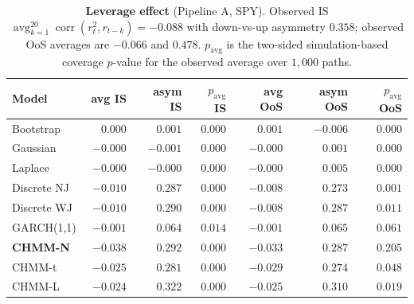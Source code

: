 \begin{table}[t]
\centering
\small
\caption{\textbf{Leverage effect} (Pipeline A, SPY). Observed IS $\operatorname{avg}_{k=1}^{20} \operatorname{corr}(r_t^2, r_{t-k}) = -0.088$ with down-vs-up asymmetry $0.358$; observed OoS averages are $-0.066$ and $0.478$. $p_{\text{avg}}$ is the two-sided simulation-based coverage $p$-value for the observed average over $1{,}000$ paths.}
\label{tab:leverage}
\begin{tabular}{lrrrrrr}
\toprule
Model & avg IS & asym IS & $p_{\text{avg}}$ IS & avg OoS & asym OoS & $p_{\text{avg}}$ OoS \\
\midrule
Bootstrap & $\phantom{-}0.000$ & $\phantom{-}0.001$ & $0.000$ & $\phantom{-}0.001$ & $-0.006$ & $0.000$ \\
Gaussian  & $-0.000$ & $-0.001$ & $0.000$ & $-0.000$ & $\phantom{-}0.001$ & $0.000$ \\
Laplace   & $-0.000$ & $-0.000$ & $0.000$ & $-0.000$ & $\phantom{-}0.005$ & $0.000$ \\
Discrete NJ & $-0.010$ & $\phantom{-}0.287$ & $0.000$ & $-0.008$ & $\phantom{-}0.273$ & $0.001$ \\
Discrete WJ & $-0.010$ & $\phantom{-}0.290$ & $0.000$ & $-0.008$ & $\phantom{-}0.287$ & $0.011$ \\
GARCH(1,1)  & $-0.001$ & $\phantom{-}0.064$ & $0.014$ & $-0.001$ & $\phantom{-}0.065$ & $0.061$ \\
\textbf{CHMM-N} & $\mathbf{-0.038}$ & $\phantom{-}0.292$ & $0.000$ & $\mathbf{-0.033}$ & $\phantom{-}0.287$ & $\mathbf{0.205}$ \\
CHMM-t  & $-0.025$ & $\phantom{-}0.281$ & $0.000$ & $-0.029$ & $\phantom{-}0.274$ & $0.048$ \\
CHMM-L  & $-0.024$ & $\phantom{-}0.322$ & $0.000$ & $-0.025$ & $\phantom{-}0.310$ & $0.019$ \\
\bottomrule
\end{tabular}
\end{table}


